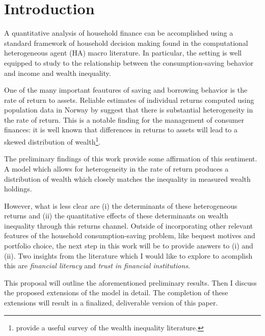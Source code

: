 \documentclass[\econtexRoot/Chp1proposal]{subfiles}
\begin{document}
\hypertarget{Introduction}{}
\section{Introduction}\notinsubfile{\label{sec:intro}}
\setcounter{page}{0}

\par A quantitative analysis of household finance can be accomplished using a standard framework of household decision making found in the computational heterogeneous agent (HA) macro literature. In particular, the setting is well equipped to study to the relationship between the consumption-saving behavior and income and wealth inequality.

\par One of the many important feautures of saving and borrowing behavior is the rate of return to assets. Reliable estimates of individual returns computed using population data in Norway by \cite{aflgdmlp20} suggest that there is substantial heterogeneity in the rate of return. This is a notable finding for the management of consumer finances: it is well known that differences in returns to assets will lead to a skewed distribution of wealth\footnote{\cite{jbab18} provide a useful survey of the wealth inequality literature.}.

\par The preliminary findings of this work provide some affirmation of this sentiment. A model which allows for heterogeneity in the rate of return produces a distribution of wealth which closely matches the inequality in measured wealth holdings.

\par However, what is less clear are (i) the determinants of these heterogeneous returns and (ii) the quantitative effects of these determinants on wealth inequality through this returns channel. Outside of incorporating other relevant features of the household consumption-saving problem, like bequest motives and portfolio choice, the next step in this work will be to provide answers to (i) and (ii). Two insights from the literature which I would like to explore to acomplish this are \textit{financial literacy} and \textit{trust in financial institutions}.

\par This proposal will outline the aforementioned preliminary results. Then I discuss the proposed extensions of the model in detail. The completion of these extensions will result in a finalized, deliverable version of this paper.


\onlyinsubfile{}

\end{document}
